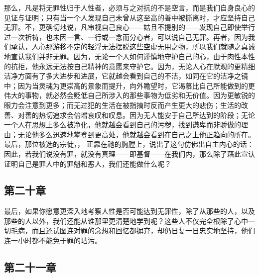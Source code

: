 那么，凡是将无罪性归于人性者，必须与之对抗的不是空言，而是我们自身良心的见证与证明；只有当一个人发现自己未曾从这至高的善中被撕离时，才应坚持自己无罪。不，更确切地说，凡审视自己良心——姑且不提别的——发现自己即使举行过一次祈祷，也未因一言、一行或一念而分心者，可以说自己无罪。再者，因为我们承认，人心那游移不定的轻浮无法摆脱这些空虚无用之物，所以我们就随之真诚地宣认我们并非无罪。因为，无论一个人如何谨慎地守护自己的心，由于肉性本性的抗拒，他永远无法按自己精神的意愿来守护它。因为，无论人心在默观的更精细洁净方面有了多大进步和进展，它就越会看到自己的不洁，如同在它的洁净之镜中；因为当灵魂为更崇高的景象而提升，向外瞻望时，它渴慕比自己所能做到的更伟大的事物，就必然会贬低自己所涉入的那些事物为低劣和无价值。因为更敏锐的眼力会注意到更多；而无过犯的生活在被指摘时反而产生更大的悲伤；生活的改善、对善的热切追求会倍增哀叹和叹息。因为无人能安于自己所达到的阶段；无论一个人在思想上多么被净化，他就越会看到自己的污秽，找到谦卑而非骄傲的理由；无论他多么迅速地攀登到更高处，他就越会看到在自己之上他正趋向的所在。最后，那位被选的宗徒，， 正靠在祂的胸膛上，说出了这句仿佛出自主内心的话：  因此，若我们说没有罪，就没有真理——即基督——在我们内，那么除了藉此宣认证明自己是罪人中的罪魁和恶人，我们还能做什么呢？\par


\subsection{第二十章}

\par

最后，如果你愿意更深入地考察人性是否可能达到无罪性，除了从那些的人，以及那些的人以外，我们还能从谁那里更清楚地学到呢？这些人不仅完全根除了心中一切毛病，而且还试图连对罪的念想和回忆都摒弃，却仍日复一日忠实地坚持，他们连一小时都不能免于罪的玷污。\par


\subsection{第二十一章}

